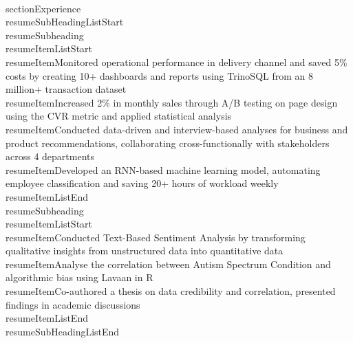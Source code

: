 \documentclass[letterpaper,11pt]{article}
\makeatletter
\newcommand{\resumeItem}[1]{
  \item\small{
    {#1 \vspace{-2pt}}
  }
}
\newcommand{\resumeSubheading}[4]{
  \vspace{-2pt}\item
    \begin{tabular*}{0.97\textwidth}[t]{l@{\extracolsep{\fill}}r}
      \textbf{#1} & #2 \\
      \textit{\small#3} & \textit{\small #4} \\
    \end{tabular*}\vspace{-7pt}
}
\newcommand{\resumeSubHeadingListStart}{\begin{itemize}[leftmargin=0.15in, label={}]}
\newcommand{\resumeSubHeadingListEnd}{\end{itemize}}
\newcommand{\resumeItemListStart}{\begin{itemize}}
\newcommand{\resumeItemListEnd}{\end{itemize}\vspace{-5pt}}
\makeatother
\begin{document}
\\section{Experience}\n  \\resumeSubHeadingListStart\n    \\resumeSubheading{}\n      \\resumeItemListStart\n        \\resumeItem{Monitored operational performance in delivery channel and saved 5\% costs by creating 10+ dashboards and reports using TrinoSQL from an 8 million+ transaction dataset}\n        \\resumeItem{Increased 2\% in monthly sales through A/B testing on page design using the CVR metric and applied statistical analysis}\n        \\resumeItem{Conducted data-driven and interview-based analyses for business and product recommendations, collaborating cross-functionally with stakeholders across 4 departments}\n        \\resumeItem{Developed an RNN-based machine learning model, automating employee classification and saving 20+ hours of workload weekly}\n      \\resumeItemListEnd\n    \\resumeSubheading{}\n      \\resumeItemListStart\n        \\resumeItem{Conducted Text-Based Sentiment Analysis by transforming qualitative insights from unstructured data into quantitative data}\n        \\resumeItem{Analyse the correlation between Autism Spectrum Condition and algorithmic bias using Lavaan in R}\n        \\resumeItem{Co-authored a thesis on data credibility and correlation, presented findings in academic discussions}\n      \\resumeItemListEnd\n  \\resumeSubHeadingListEnd\n
\end{document}
